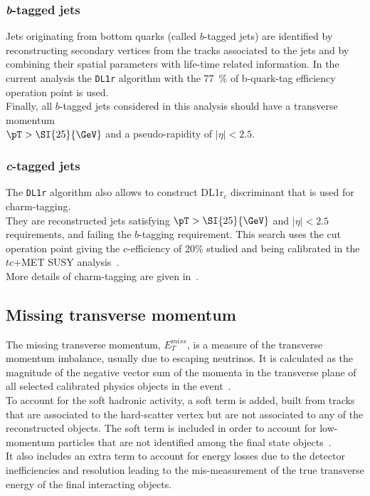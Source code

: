 \subsubsection {\textit{b}-tagged jets}
\label{sec:object:bjet}
Jets originating from bottom quarks (called $b$-tagged jets) are
identified by reconstructing secondary vertices from the tracks
associated to the jets and by combining their spatial parameters with
life-time related information.
In the current analysis the \texttt{DL1r} algorithm with the \SI{77}{\%} of b-quark-tag efficiency operation point is used.\\
Finally, all $b$-tagged jets considered in this analysis should have a transverse
momentum\\ $\pT >\SI{25}{\GeV}$ and a pseudo-rapidity of
$|\eta|\!<\!2.5$.  
\subsubsection {\textit{c}-tagged jets}
\label{sec:object:cjet}
The \texttt{DL1r} algorithm also allows to construct DL1r$_{c}$ discriminant that is used for charm-tagging.\\
They are reconstructed jets satisfying $\pT > \SI{25}{\GeV}$ and $|\eta| < 2.5$ requirements,
and failing the $b$-tagging requirement.
This search uses the cut operation point giving the $c$-efficiency of 20\% studied and being calibrated
in the $tc$+MET SUSY analysis~\cite{ANA-SUSY-2019-23}.\\
More details of charm-tagging are given in~.

\subsection{Missing transverse momentum}
\label{sec:object:met}
The missing transverse momentum, $E^{miss}_{T}$, is a measure of the transverse momentum
imbalance, usually due to escaping neutrinos. 
It is calculated as the magnitude of the negative vector sum of the momenta 
in the transverse plane of all selected calibrated physics objects in the event~\cite{MTM1,MTM2}. \\
To account for the soft hadronic activity, a soft term is added, built from
tracks that are associated to the hard-scatter vertex but are not
associated to any of the reconstructed objects. The soft term is
included in order to account for low-momentum particles that are not
identified among the final state objects~\cite{PERF-2011-07,PERF-2014-04,ATL-PHYS-PUB-2015-027}.\\
It also includes an extra term to account for energy losses due to the detector inefficiencies 
and resolution leading to the mis-measurement of the true transverse energy of the final 
interacting objects.

